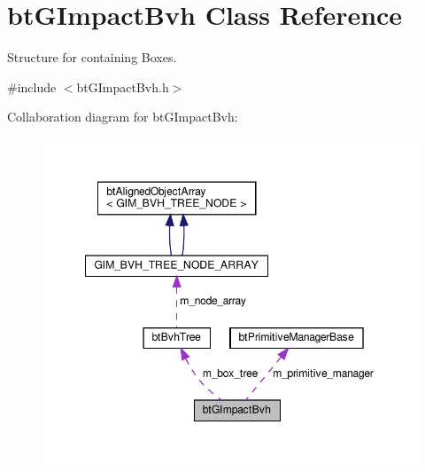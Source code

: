 \hypertarget{classbtGImpactBvh}{}\section{bt\+G\+Impact\+Bvh Class Reference}
\label{classbtGImpactBvh}


Structure for containing Boxes.  




{\ttfamily \#include $<$bt\+G\+Impact\+Bvh.\+h$>$}



Collaboration diagram for bt\+G\+Impact\+Bvh\+:
\nopagebreak
\begin{figure}[H]
\begin{center}
\leavevmode
\includegraphics[width=348pt]{classbtGImpactBvh__coll__graph}
\end{center}
\end{figure}
